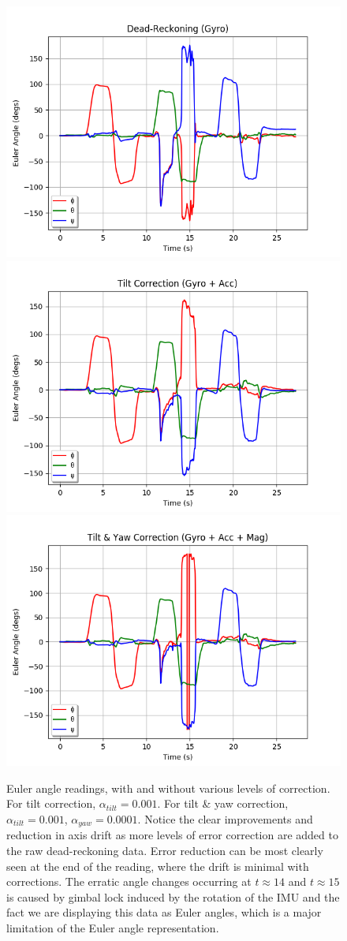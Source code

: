 \documentclass[11pt]{article}
\begin{document}
\begin{figure}[htp]

\centering
\includegraphics[width=.32\textwidth]{1gyro_dead}\hfill
\includegraphics[width=.32\textwidth]{2gyro_acc}\hfill
\includegraphics[width=.32\textwidth]{3gyro_acc_mag}

\caption{Euler angle readings, with and without various levels of correction. For tilt correction, $\alpha_{tilt}=0.001$. For tilt \& yaw correction, $\alpha_{tilt}=0.001$, $\alpha_{yaw}=0.0001$. Notice the clear improvements and reduction in axis drift as more levels of error correction are added to the raw dead-reckoning data. Error reduction can be most clearly seen at the end of the reading, where the drift is minimal with corrections. The erratic angle changes occurring at $t\approx14$ and $t\approx15$ is caused by gimbal lock induced by the rotation of the IMU and the fact we are displaying this data as Euler angles, which is a major limitation of the Euler angle representation.}
\label{fig:euler-angles}

\end{figure}
\end{document}
